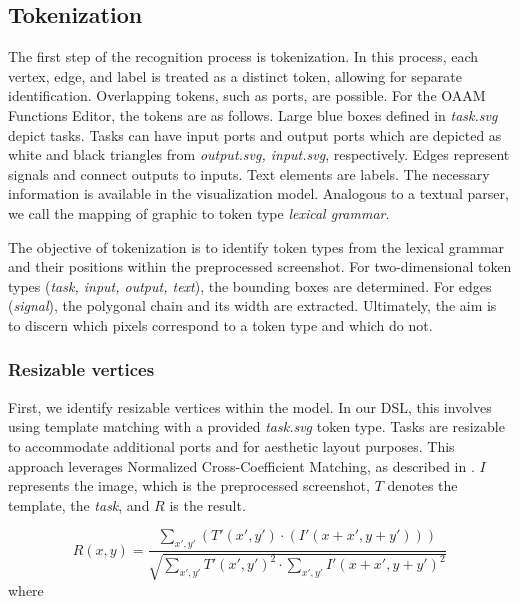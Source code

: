 \subsection{Tokenization}
The first step of the recognition process is tokenization. In this process, each vertex, edge, and label is treated as a distinct token, allowing for separate identification. Overlapping tokens, such as ports, are possible. For the OAAM Functions Editor, the tokens are as follows. Large blue boxes defined in \emph{task.svg} depict tasks. Tasks can have input ports and output ports which are depicted as white and black triangles from \emph{output.svg, input.svg}, respectively. Edges represent signals and connect outputs to inputs. Text elements are labels. The necessary information is available in the visualization model. Analogous to a textual parser, we call the mapping of graphic to token type \emph{lexical grammar}. 

The objective of tokenization is to identify token types from the lexical grammar and their positions within the preprocessed screenshot. For two-dimensional token types (\emph{task, input, output, text}), the bounding boxes are determined. For edges (\emph{signal}), the polygonal chain and its width are extracted. Ultimately, the aim is to discern which pixels correspond to a token type and which do not.

\subsubsection{Resizable vertices}
First, we identify resizable vertices within the model. In our DSL, this involves using template matching with a provided \emph{task.svg} token type. Tasks are resizable to accommodate additional ports and for aesthetic layout purposes. This approach leverages Normalized Cross-Coefficient Matching, as described in \cite{Lewis1995}. $I$ represents the image, which is  the preprocessed screenshot,  $T$ denotes the template, the \emph{task}, and  $R$ is the result. 


\begin{equation}
  R(x, y) = \frac{\sum_{x', y'} \left( T'(x', y') \cdot \left( I'(x + x', y + y')  \right) \right)}  {\sqrt{\sum_{x', y'}  T'(x', y')^2 \cdot \sum_{x', y'}  I'(x + x', y + y') ^2}}
\end{equation}
where


